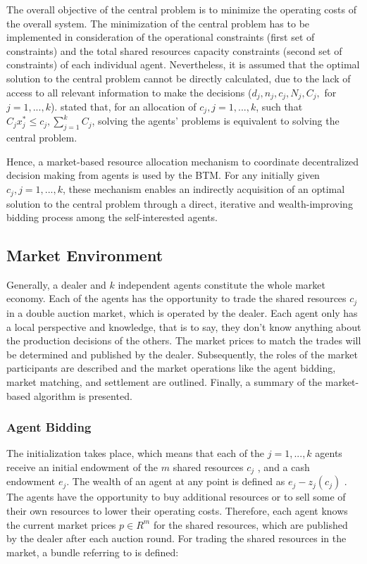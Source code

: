 The overall objective of the central problem is to minimize the operating costs of the overall system. The minimization of the central problem
has to be implemented in consideration of the operational constraints 
(first set of constraints) and the total shared resources capacity constraints (second set of constraints) of each individual agent. 
Nevertheless, it is assumed that the optimal solution to the central problem cannot be directly calculated, due to the lack of access to all relevant
information to make the decisions ($d_{j}, n_{j}, c_{j}, N_{j}, C_{j},$ for $j=1, ..., k$). 
 stated that, for an allocation of 
$c_{j}, j=1, ..., k$, such that $C_{j}x_{j}^{*} \leq c_{j}, \sum\limits_{j=1}^{k} C_{j}$, 
solving the agents’ problems is equivalent to solving the central problem.

Hence, a market-based resource allocation mechanism to coordinate decentralized
decision making from agents is used by the BTM. 
For any initially given $c_{j}, j=1, ..., k$, these mechanism enables an indirectly
acquisition of an optimal solution to the central problem through a direct, iterative and
wealth-improving bidding process among the self-interested agents. 


\subsection{Market Environment}
Generally, a dealer and $k$ independent agents constitute the whole market economy. 
Each of the agents has the opportunity to trade the shared resources $c_{j}$ 
in a double auction market, which is operated by the dealer. Each agent only has a local perspective 
and knowledge, that is to say, they don't know anything about the production decisions of the others. 
The market prices to match the trades will be determined and published by the dealer.
Subsequently, the roles of the market participants are described
and the market operations like the agent bidding, market matching, 
and settlement are outlined. Finally, a summary of the market-based algorithm is presented. 

\subsubsection{Agent Bidding}
\label{sec:agent_bidding}
The initialization takes place, which means that each of the $j=1, ..., k$ agents receive an initial
endowment of the $m$ shared resources $c_{j}$ , and a cash endowment $e_{j}$.
The wealth of an agent at any point is defined as $e_{j} - z_{j}(c_{j})$ .
The agents have the opportunity to buy additional resources or to sell some of their own resources to lower their operating costs. 
Therefore, each agent knows the current market prices $p \in R^{m}$ for the shared resources, 
which are published by the dealer after each auction round. For trading the shared resources in the market, 
a bundle referring to  is defined:

